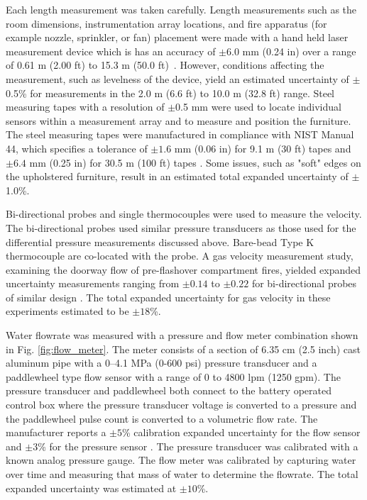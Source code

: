 \documentclass[12pt,oneside]{book}
\begin{document}
Each length measurement was taken carefully. Length measurements such as the room dimensions,
instrumentation array locations, and fire apparatus (for example nozzle, sprinkler, or fan) placement were made with a hand held laser measurement device which is has an accuracy of $\pm6.0$ mm (0.24 in) over a range of 0.61 m (2.00 ft) to 15.3 m (50.0 ft)~\cite{Stanley}. However, conditions affecting the measurement, such as levelness of the device, yield an
estimated uncertainty of $\pm$0.5\% for measurements in the 2.0 m (6.6 ft) to 10.0 m (32.8 ft) range. Steel measuring tapes with a resolution of $\pm$0.5 mm were used to locate individual sensors within a measurement array and to measure and position the furniture. The steel measuring tapes were manufactured in compliance with NIST Manual 44, which specifies a tolerance of $\pm1.6$ mm (0.06 in) for 9.1 m (30 ft) tapes and $\pm6.4$ mm (0.25 in) for 30.5 m (100 ft) tapes \cite{NIST_Manual_44}. Some issues, such as "soft" edges on the upholstered furniture, result in an estimated total expanded uncertainty of $\pm$1.0\%. 

Bi-directional probes and single thermocouples were used to measure the velocity. The bi-directional probes used similar pressure transducers as those used for the differential pressure measurements discussed above. Bare-bead Type K thermocouple are co-located with the probe. A gas velocity measurement study, examining the doorway flow of pre-flashover compartment fires, yielded expanded uncertainty measurements ranging from $\pm0.14$ to $\pm0.22$ for bi-directional probes of similar design \cite{Bryant:FSJ2009}. The total expanded uncertainty for gas velocity in these experiments estimated to be $\pm18$\%.   

Water flowrate was measured with a pressure and flow meter combination shown in Fig. \ref{fig:flow_meter}. The meter consists of a section of 6.35 cm (2.5 inch) cast aluminum pipe with a 0–4.1 MPa (0-600 psi) pressure transducer and a paddlewheel type flow sensor with a range of 0 to 4800 lpm (1250 gpm). The pressure transducer and paddlewheel both connect to the battery operated control box where the pressure transducer voltage is converted to a pressure and the paddlewheel pulse count is converted to a volumetric flow rate. The manufacturer reports a $\pm5$\% calibration expanded uncertainty for the flow sensor and $\pm3$\%  for the pressure sensor \cite{Akron}. The pressure transducer was calibrated with a known analog pressure gauge. The flow meter was calibrated by capturing water over time and measuring that mass of water to determine the flowrate. The total expanded uncertainty was estimated at $\pm10$\%. 
\end{document}
